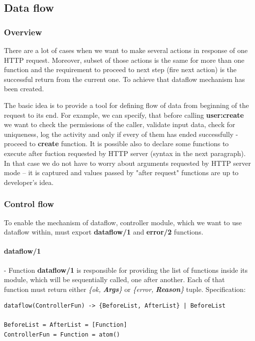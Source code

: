\subsection{Data flow}
\subsubsection{Overview}There are a lot of cases when we want to make several actions in response of one HTTP request. Moreover, subset of those actions is the same for more than one function and the requirement to proceed to next step (fire next action) is the successful return from the current one. To achieve that dataflow mechanism has been created.

The basic idea is to provide a tool for defining flow of data from beginning
of the request to its end. For example, we can specify, that before calling
{\bf user:create} we want to check the permissions of the caller, validate
input data, check for uniqueness, log the activity and only if every of them
has ended successfully - proceed to {\bf create} function. It is possible also
to declare some functions to execute after fuction requested by HTTP server
(syntax in the next paragraph). In that case we do not have to worry about
arguments requested by HTTP server mode -- it is captured and values passed by
"after request" functions are up to developer's idea. 

\subsubsection{Control flow}To enable the mechanism of dataflow, controller module, which we want to use dataflow within, must export {\bf dataflow/1} and {\bf error/2} functions. 
\paragraph{dataflow/1}- Function {\bf dataflow/1} is responsible for providing the list of functions inside its module, which will be sequentially called, one after another. Each of that function must return either {\it \{ok, }{\bf {\em Args}}{\it \}} or {\it \{error, }{\bf {\em Reason}}{\it \}} tuple. \newline
Specification:
\begin{Verbatim}
dataflow(ControllerFun) -> {BeforeList, AfterList} | BeforeList

BeforeList = AfterList = [Function]
ControllerFun = Function = atom()
\end{Verbatim}

